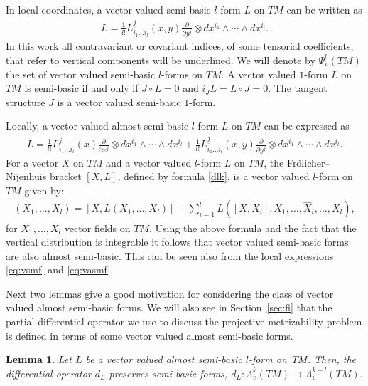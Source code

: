 \documentclass[11pt]{article}
\numberwithin{equation}{section}
\newtheorem{Lemma}[Theorem]{Lemma}
\begin{document}
In local coordinates, a vector valued semi-basic $l$-form $L$ on
$TM$ can be written as
\begin{gather}
L=\frac{1}{l!}L^{\underline{j}}_{i_1\dots i_l}(x,y)\frac{\partial}{\partial y^j}\otimes dx^{i_1}\wedge \cdots
\wedge dx^{i_l}.\label{eq:vsmf}
\end{gather} In this work all contravariant or covariant
indices, of some tensorial coef\/f\/icients, that refer to vertical components will be underlined. We
will denote by $\Psi^l_v(TM)$ the set of vector valued semi-basic
$l$-forms on $TM$. A vector valued $1$-form $L$ on $TM$ is
semi-basic if and only if $J\circ L=0$ and $i_JL=L \circ J=0$. The
tangent structure $J$ is a vector valued semi-basic $1$-form.

Locally, a vector valued almost semi-basic $l$-form $L$ on $TM$ can be
expressed as
\begin{gather}
 L =\frac{1}{l!}L^{j}_{i_1\dots i_l}(x)\frac{\partial}{\partial
x^j}\otimes dx^{i_1}\wedge \cdots \wedge dx^{i_l}  +
\frac{1}{l!}L^{\underline{j}}_{i_1\dots i_l}(x,y)\frac{\partial}{\partial
y^j}\otimes dx^{i_1}\wedge \cdots \wedge
dx^{i_l}.\label{eq:vasmf}
\end{gather}
For a vector $X$ on $TM$ and a vector valued $l$-form $L$
on $TM$, the Fr\"olicher--Nijenhuis bracket $[X,L]$, def\/ined by formula
\eqref{dlk}, is a vector valued $l$-form on $TM$ given by:
\begin{gather*}
[X,L](X_1,\dots ,X_l)=[X,L(X_1,\dots ,X_l)] - \sum_{i=1}^lL([X,X_i],
X_1,\dots ,\hat{X}_i,\dots ,X_l),  %
\end{gather*}
for $X_1, \dots , X_l$ vector f\/ields on $TM$. Using the above formula and the fact that the vertical distribution is integrable it
follows that vector valued semi-basic forms are also almost
semi-basic. This can be seen also from the local expressions
\eqref{eq:vsmf} and \eqref{eq:vasmf}.

Next two lemmas give a good motivation for considering the class of vector
valued almost semi-basic forms. We will also see in Section~\ref{sec:fi} that the partial
dif\/ferential operator we use to discuss the projective metrizability
problem is def\/ined in terms of some vector valued almost
semi-basic forms.

\begin{Lemma} \label{lem:dlomega} Let $L$ be a vector valued almost semi-basic $l$-form on~$TM$.
Then, the differential operator $d_L$ preserves semi-basic forms,
$d_L: \Lambda^k_v(TM) \to \Lambda^{k+l}_v(TM).$
\end{Lemma}
\end{document}
